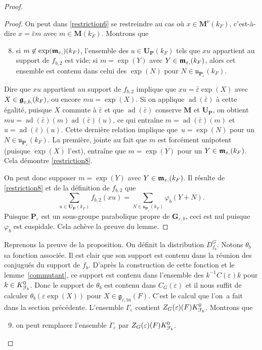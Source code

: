 \documentclass[11pt]{article}
\numberwithin{equation}{section}\providecommand{\og}{«\,}\providecommand{\fg}{\,»}
\let\mathcal \EuScript
\newcommand{\NoChangel}[1]{%
\expandafter\let\csname old\string#1\endcsname=#1
\let#1=\relax
\newcommand{#1}{\mathcode`l="716C\csname old\string#1\endcsname\mathcode`l="7160 }%
}
\let\epsilon\varepsilon
\newcommand{\frg}{\mathfrak{g}}
\newcommand{\mfrm}{\mathfrak{m}}
\newcommand{\fru}{\mathfrak{u}}
\newcommand{\nil}{\mathrm{nil}} \NoChangel{\nil}
\newcommand{\tn}{\mathrm{tn}}
\DeclareMathOperator{\ad}{ad}
\newcommand{\bG}{\boldsymbol{G}}
\newcommand{\bM}{\boldsymbol{M}}
\newcommand{\bP}{\boldsymbol{P}}
\newcommand{\bU}{\boldsymbol{U}}
\newcommand{\cF}{\mathcal{F}}
\theoremstyle{plain}
\theoremstyle{definition}
\begin{document}
\begin{proof}
\begin{proof}
On peut dans \eqref{restriction6} se restreindre au cas où $x\in \bM^{\nu}(k_{F})$, c'est-à-dire $x=\bar{\epsilon}m$ avec $m\in \bM(k_{F})$. Montrons que
\begin{enumerate}\setcounter{enumi}{7}
\item\label{restriction8}
si $m\not\in \exp(\boldsymbol{\mfrm}_{\epsilon,\nil})(k_{F})$, l'ensemble des $u\in \bU_{\bP}(k_{F})$ tels que $xu$ appartient au support de $f_{b,2}$ est vide; si $m=\exp(Y)$ avec $Y\in \boldsymbol{\mfrm}_{\epsilon,\nil}(k_{F})$, alors cet ensemble est contenu dans celui des $\exp(N)$ pour $N\in \boldsymbol{\fru}_{\bP_{\epsilon}}(k_{F})$.
\end{enumerate}

Dire que $xu$ appartient au support de $f_{b,2}$ implique que $xu=\bar{\epsilon} \exp(X)$ avec $X\in \boldsymbol{\frg}_{\epsilon,b,\nil}(k_{F})$, ou encore $mu=\exp(X)$. Si on applique $\ad(\bar{\epsilon})$ à cette égalité, puisque $X$ commute à $\bar{\epsilon}$ et que $\ad(\bar{\epsilon})$ conserve $\bM$ et $\bU_{\bP}$, on obtient $mu=\ad(\bar{\epsilon})(m)\ad(\bar{\epsilon})(u)$, ce qui entraîne $m=\ad(\bar{\epsilon})(m)$ et $u=\ad(\bar{\epsilon})(u)$. Cette dernière relation implique que~$u=\exp(N)$ pour un $N\in \boldsymbol{\fru}_{\bP_{\epsilon}}(k_{F})$. La première, jointe au fait que $m$ est forcément unipotent (puisque $\exp(X)$ l'est), entraîne que $m=\exp(Y)$ pour un $Y\in \boldsymbol{\mfrm}_{\epsilon,\nil}(k_{F})$. Cela démontre \eqref{restriction8}.

On peut donc supposer $m=\exp(Y)$ avec $Y\in \boldsymbol{\mfrm}_{\epsilon,\nil}(k_{F})$. Il résulte de \eqref{restriction8} et de la définition de $f_{b,2}$ que
\[
\sum_{u\in \bU_{\bP}(k_{F})}f_{b,2}(xu)=\sum_{N\in \boldsymbol{\fru}_{\bP_{\epsilon}}(k_{F}) }\varphi_{b}(Y+N).
\]
Puisque $\bP_{\epsilon}$ est un sous-groupe parabolique propre de $\bG_{\epsilon,b}$, ceci est nul puisque $\varphi_{b}$ est cuspidale. Cela achève la preuve du lemme.
\end{proof}

Reprenons la preuve de la proposition. On définit la distribution $D^G_{f_{b}}$. Notons $\theta_{b}$ sa fonction associée. Il est clair que son support est contenu dans la réunion des conjugués du support de $f_{b}$. D'après la construction de cette fonction et le lemme~\ref{commutant}, ce support est contenu dans l'ensemble des $k^{-1}C(\epsilon)k$ pour $k\in K_{\cF_{b}}^0$. Donc le support de $\theta_{b}$ est contenu dans $C_{G}(\epsilon)$ et il nous suffit de calculer $\theta_{b}(\epsilon \exp(X))$ pour $X\in \frg_{\epsilon,\tn}(F)$.
C'est le calcul que l'on~a fait dans la section précédente. L'ensemble $\Gamma_{\epsilon}$ contient $Z_{G}(\epsilon)(F)K_{\cF_{b}}^0$. Montrons que
\begin{enumerate}\setcounter{enumi}{8}
\item\label{restriction9}
on peut remplacer l'ensemble $\Gamma_{\epsilon}$ par $Z_{G}(\epsilon)(F)K_{\cF_{b}}^0$.
\end{enumerate}


\end{proof}
\end{document}
